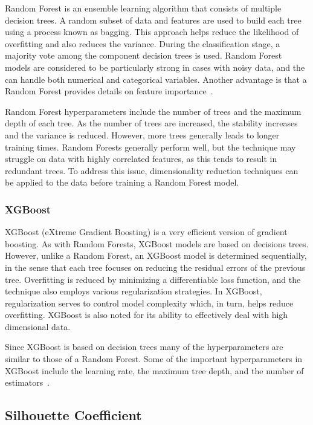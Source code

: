 \documentclass[12pt]{article}
\begin{document}
Random Forest is an ensemble learning algorithm that consists of multiple decision trees. 
A random subset of data and features are used to build each tree using a process known as bagging. 
This approach helps reduce the likelihood of overfitting and also reduces the variance. During the classification 
stage, a majority vote among the component decision trees is used.
Random Forest models are considered to be particularly strong in cases with noisy data,
and the can handle both numerical and categorical variables. Another advantage is 
that a Random Forest provides details on feature importance~\cite{ibm_random_forest}.

Random Forest hyperparameters include the number of trees and the maximum depth of each tree. 
As the number of trees are increased, the stability increases and the variance is reduced. 
However, more trees generally leads to longer training times. Random Forests generally perform
well, but the technique may struggle on data with highly correlated features, as this tends to
result in redundant trees. To address this issue, dimensionality reduction techniques can be 
applied to the data before training a Random Forest model.

\subsubsection{XGBoost}

XGBoost (eXtreme Gradient Boosting) is a very efficient version of gradient boosting. 
As with Random Forests, XGBoost models are based on decisions trees.
However, unlike a Random Forest, an XGBoost model is determined sequentially,
in the sense that each tree focuses on reducing the residual errors of the previous tree. 
Overfitting is reduced by minimizing a differentiable loss function, and the technique 
also employs various regularization strategies. In XGBoost, regularization serves to control model 
complexity which, in turn, helps reduce overfitting.  XGBoost is also noted for its
ability to effectively deal with high dimensional data. 

Since XGBoost is based on decision trees many of the hyperparameters are similar to those
of a Random Forest. Some of the important hyperparameters in XGBoost include 
the learning rate, the maximum tree depth, and the number of estimators~\cite{ibm_xgboost}. 

\subsection{Silhouette Coefficient}
\end{document}
